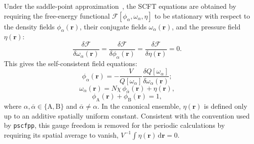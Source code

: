     Under the saddle-point approximation~\cite{Leibler1980Theory, Huang1998SelfConsistent, XinghuaZhang2013Effects, Zhao2024Phase}, the SCFT equations are obtained by requiring the free-energy functional $\mathcal{F}[\phi_\alpha,\omega_\alpha,\eta]$ to be stationary with respect to the density fields $\phi_\alpha(\bm r)$, their conjugate fields $\omega_\alpha(\bm r)$, and the pressure field $\eta(\bm r)$:
    \begin{equation}
        \frac{\delta \mathcal{F}}{\delta \omega_\alpha(\bm{r})} 
        = \frac{\delta \mathcal{F}}{\delta \phi_\alpha(\bm{r})} 
        = \frac{\delta \mathcal{F}}{\delta \eta(\bm{r})}
        = 0.
    \end{equation}
    This gives the self-consistent field equations:
    \begin{equation}
        \phi_\alpha(\bm{r}) = - \frac{V}{Q[\omega_\alpha]} \frac{\delta Q[\omega_\alpha]}{\delta \omega_\alpha(\bm{r})};
        \label{eq:DensityField}
    \end{equation}
    \begin{equation}
        \omega_\alpha(\bm{r}) = N \chi \, \phi_{\overline{\alpha} }(\bm{r}) + \eta(\bm r),
        \label{eq:ConjugateField}
    \end{equation}
    \begin{equation}
        \phi_{\mathrm A}(\bm r)+\phi_{\mathrm B}(\bm r)=1,
        \label{eq:Incompressibility}
    \end{equation}
    where $\alpha, \overline{\alpha} \in \{\mathrm{A}, \mathrm{B}\}$ and $\overline{\alpha} \neq \alpha$.
    In the canonical ensemble, $\eta(\bm r)$ is defined only up to an additive spatially uniform constant.
    Consistent with the convention used by \texttt{pscfpp}, this gauge freedom is removed for the periodic calculations by requiring its spatial average to vanish, $V^{-1}\int \eta(\bm r)\,\mathrm d\bm r=0$.
    

